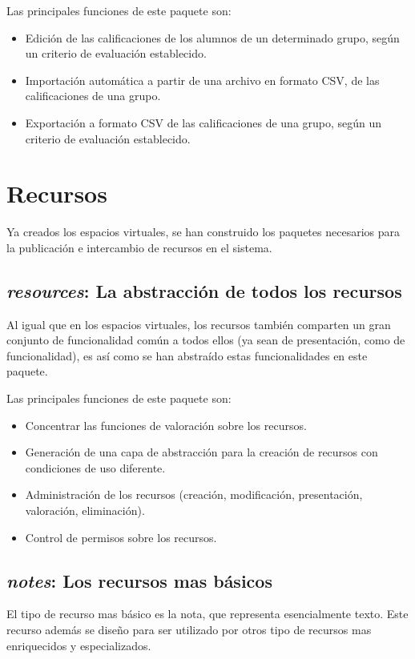 Las principales funciones de este paquete son:

\begin{itemize}
\item Edición de las calificaciones de los alumnos de un determinado grupo,
según un criterio de evaluación establecido.
\item Importación automática a partir de una archivo en formato CSV, de las
calificaciones de una grupo.
\item Exportación a formato CSV de las calificaciones de una grupo, según un
criterio de evaluación establecido.
\end{itemize}

\section{Recursos}
Ya creados los espacios virtuales, se han construido los paquetes necesarios
para la publicación e intercambio de recursos en el sistema.

\subsection{\emph{resources}: La abstracción de todos los recursos}
Al igual que en los espacios virtuales, los recursos también comparten un gran
conjunto de funcionalidad común a todos ellos (ya sean de presentación, como de
funcionalidad), es así como se han abstraído estas funcionalidades en este
paquete.

Las principales funciones de este paquete son:

\begin{itemize}
\item Concentrar las funciones de valoración sobre los recursos.
\item Generación de una capa de abstracción para la creación de recursos con
condiciones de uso diferente.
\item Administración de los recursos (creación, modificación, presentación,
valoración, eliminación).
\item Control de permisos sobre los recursos.
\end{itemize}

\subsection{\emph{notes}: Los recursos mas básicos}
El tipo de recurso mas básico es la nota, que representa esencialmente texto.
Este recurso además se diseño para ser utilizado por otros tipo de recursos mas
enriquecidos y especializados.

